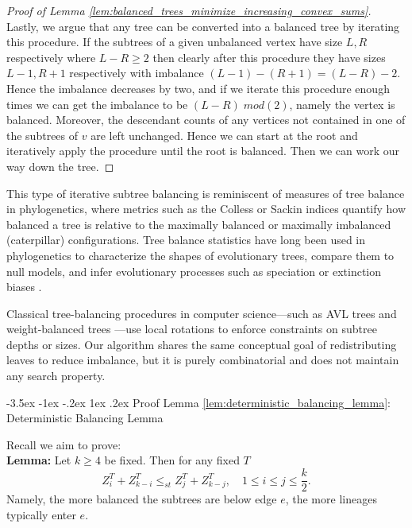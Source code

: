 \documentclass[10pt,oneside,reqno]{article}
\makeatletter
\theoremstyle{plain}
\theoremstyle{definition}
\numberwithin{equation}{section}
\def\subsection#1{\@startsection {subsection}{2}{0pt}%
{-3.5ex \@plus -1ex \@minus -.2ex}%
{1ex \@plus.2ex}%
{\bf\mathversion{bold}}{#1}}
\renewcommand{\cite}{\citep}
\renewcommand{\leq}{\leqslant}
\renewcommand{\geq}{\geqslant}
\makeatother
\begin{document}
\begin{proof}[Proof of Lemma \ref{lem:balanced_trees_minimize_increasing_convex_sums}]
Lastly, we argue that any tree can be converted into a balanced tree by iterating this procedure. If the subtrees of a given unbalanced vertex have size $L,R$ respectively where $L-R \geq 2$ then clearly after this procedure they have sizes $L-1, R+1$ respectively with imbalance $(L-1) - (R+1) = (L-R) - 2$. Hence the imbalance decreases by two, and if we iterate this procedure enough times we can get the imbalance to be $(L-R) \; mod(2)$, namely the vertex is balanced. Moreover, the descendant counts of any vertices not contained in one of the subtrees of $v$ are left unchanged. Hence we can start at the root and iteratively apply the procedure until the root is balanced. Then we can work our way down the tree. 
\end{proof}

This type of iterative subtree balancing is reminiscent of measures of tree balance in phylogenetics, where metrics such as the Colless or Sackin indices quantify how balanced a tree is relative to the maximally balanced or maximally imbalanced (caterpillar) configurations. Tree balance statistics have long been used in phylogenetics to characterize the shapes of evolutionary trees, compare them to null models, and infer evolutionary processes such as speciation or extinction biases \cite{kersting2025tree}. 

Classical tree-balancing procedures in computer science—such as AVL trees \cite{adelson1962algorithm} and weight-balanced trees \cite{nievergelt1973binary}—use local rotations to enforce constraints on subtree depths or sizes. Our algorithm shares the same conceptual goal of redistributing leaves to reduce imbalance, but it is purely combinatorial and does not maintain any search property.


\newpage 
\subsection{Proof Lemma \ref{lem:deterministic_balancing_lemma}: Deterministic Balancing Lemma}
\label{app:deterministic-balancing-proof}

Recall we aim to prove:\\

\noindent \textbf{Lemma:} Let $k \geq 4$ be fixed. Then for any fixed $T$
    \[Z^T_{i} + Z^T_{k-i} \leq_{st} Z^T_{j} + Z^T_{k-j},  \quad  1 \leq i \leq j \leq \frac{k}{2}.\]
    \noindent Namely, the more balanced the subtrees are below edge $e$, the more lineages typically enter $e$.
\end{document}

